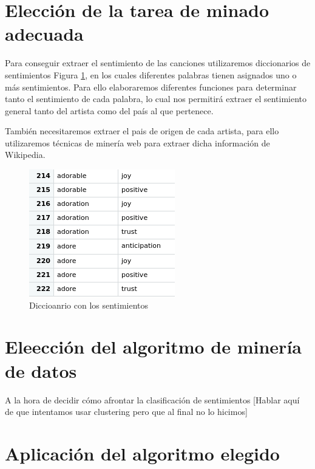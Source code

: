\section{Elección de la tarea de minado adecuada}

Para conseguir extraer el sentimiento de las canciones utilizaremos diccionarios de sentimientos Figura \ref{fig:diccionariosentimientos}, en los cuales diferentes palabras tienen asignados uno o más sentimientos. Para ello elaboraremos diferentes funciones para determinar tanto el sentimiento de cada palabra, lo cual nos permitirá extraer el sentimiento general tanto del artista como del país al que pertenece.

También necesitaremos extraer el pais de origen de cada artista, para ello utilizaremos técnicas de minería web para extraer dicha información de Wikipedia.

\begin{figure}[h]
	\centering
	\includegraphics[width=0.7\linewidth]{Imagenes/diccionariosentimientos}
	\caption{Diccioanrio con los sentimientos}
	\label{fig:diccionariosentimientos}
\end{figure}

\section{Eleección del algoritmo de minería de datos}

A la hora de decidir cómo afrontar la clasificación de sentimientos [Hablar aquí de que intentamos usar clustering pero que al final no lo hicimos]

\section{Aplicación del algoritmo elegido}

